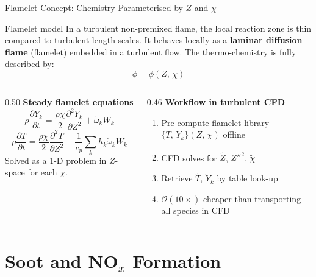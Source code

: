 \documentclass[12pt,aspectratio=169]{beamer}
\newcommand{\wdot}{\dot{\omega}}
\begin{document}
\begin{frame}{Flamelet Concept: Chemistry Parameterised by $Z$ and $\chi$}

  \begin{block}{Flamelet model}
    In a turbulent non-premixed flame, the local reaction zone is
    thin compared to turbulent length scales.
    It behaves locally as a \textbf{laminar diffusion flame}
    (flamelet) embedded in a turbulent flow.
    The thermo-chemistry is fully described by:
    \[
      \phi = \phi(Z,\,\chi)
    \]
  \end{block}

  \begin{columns}[t]
    \begin{column}{0.50\textwidth}
      \textbf{Steady flamelet equations}
      \[
        \rho\frac{\partial Y_k}{\partial t}
        = \frac{\rho\chi}{2}\frac{\partial^2 Y_k}{\partial Z^2}
          + \wdot_k W_k
      \]
      \[
        \rho\frac{\partial T}{\partial t}
        = \frac{\rho\chi}{2}\frac{\partial^2 T}{\partial Z^2}
          - \frac{1}{c_p}\sum_k h_k\wdot_k W_k
      \]
      Solved as a 1-D problem in $Z$-space for each $\chi$.
    \end{column}
    \begin{column}{0.46\textwidth}
      \textbf{Workflow in turbulent CFD}
      \begin{enumerate}
        \item Pre-compute flamelet library
              $\{T,\,Y_k\}(Z,\,\chi)$ offline
        \item CFD solves for $\tilde{Z}$,
              $\widetilde{Z''^2}$, $\tilde{\chi}$
        \item Retrieve $\tilde{T}$, $\tilde{Y}_k$
              by table look-up
        \item $\mathcal{O}(10\times)$ cheaper than
              transporting all species in CFD
      \end{enumerate}
    \end{column}
  \end{columns}
\end{frame}

\section{Soot and NO\texorpdfstring{$_x$}{x} Formation}
\end{document}
